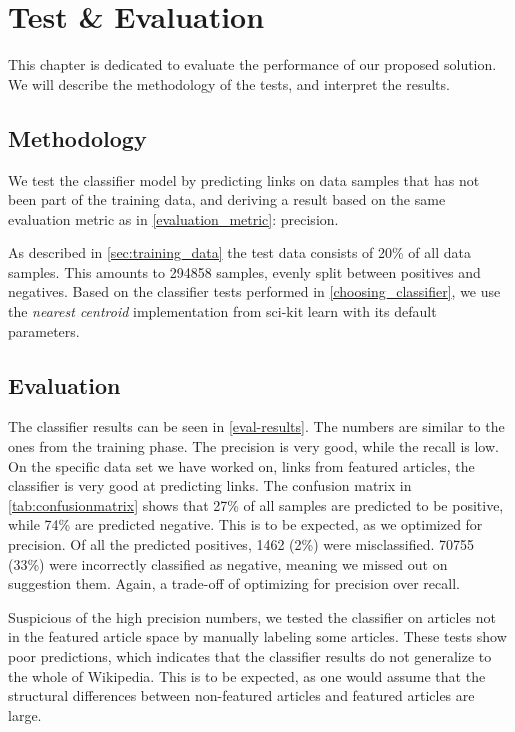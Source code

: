 \chapter{Test \& Evaluation}\label{chap:testeval}
This chapter is dedicated to evaluate the performance of our proposed solution. We will describe the methodology of the tests, and interpret the results.

\section{Methodology}
We test the classifier model by predicting links on data samples that has not been part of the training data, and deriving a result based on the same evaluation metric as in \cref{evaluation_metric}: precision.

As described in \cref{sec:training_data} the test data consists of 20\% of all data samples. This amounts to \num{294858} samples, evenly split between positives and negatives. Based on the classifier tests performed in \cref{choosing_classifier}, we use the \emph{nearest centroid} implementation from sci-kit learn with its default parameters.

\section{Evaluation}
The classifier results can be seen in \cref{eval-results}. The numbers are similar to the ones from the training phase. The precision is very good, while the recall is low. On the specific data set we have worked on, links from featured articles, the classifier is very good at predicting links. The confusion matrix in \cref{tab:confusionmatrix} shows that 27\% of all samples are predicted to be positive, while 74\% are predicted negative. This is to be expected, as we optimized for precision. Of all the predicted positives, 1462 (2\%) were misclassified. \num{70755} (33\%) were incorrectly classified as negative, meaning we missed out on suggestion them. Again, a trade-off of optimizing for precision over recall.

Suspicious of the high precision numbers, we tested the classifier on articles not in the featured article space by manually labeling some articles. These tests show poor predictions, which indicates that the classifier results do not generalize to the whole of Wikipedia. This is to be expected, as one would assume that the structural differences between non-featured articles and featured articles are large.

